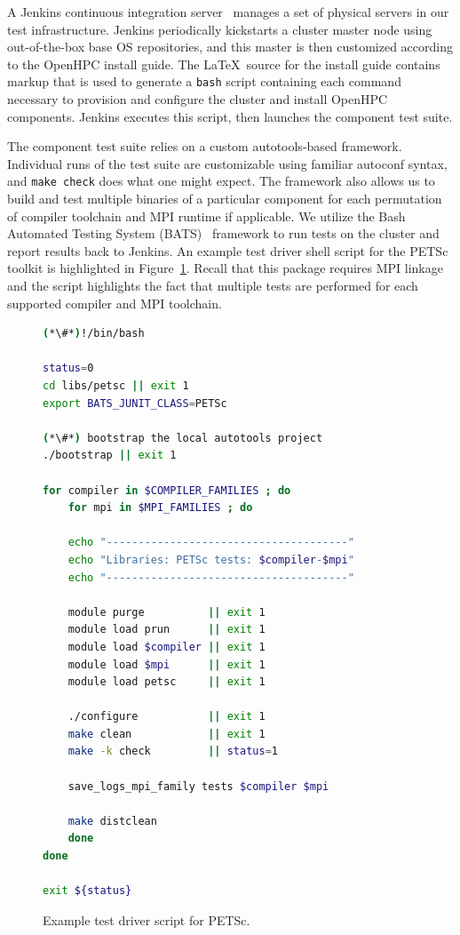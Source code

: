 \documentclass{sig-alternate-05-2015}
\begin{document}
A Jenkins continuous integration server~\cite{jenkins_url} manages a set of 
physical servers in our test infrastructure. Jenkins periodically kickstarts a cluster 
master node using out-of-the-box base OS repositories, and this master is then 
customized according to the OpenHPC install guide. The \LaTeX\ source for the 
install guide contains markup that is used to generate a \texttt{{bash}} script 
containing each command necessary to provision and configure the cluster and install OpenHPC
components. Jenkins executes this script, then launches the component test suite.

The component test suite relies on a custom autotools-based framework.
Individual runs of the test suite are customizable using familiar autoconf
syntax, and \texttt{{make check}} does what one might expect. The framework
also allows us to build and test multiple binaries of a particular component
for each permutation of compiler toolchain and MPI runtime if applicable.  We
utilize the Bash Automated Testing System (BATS)~\cite{bats_url} framework to
run tests on the cluster and report results back to Jenkins. An example test
driver shell script for the PETSc toolkit is highlighted in Figure~\ref{fig:test_loop}. Recall that this package
requires MPI linkage and the script highlights the fact that multiple tests are
performed for each supported compiler and MPI toolchain.

\begin{figure}[t]
\begin{lstlisting}[language=bash,keywords={},keepspaces]
(*\#*)!/bin/bash

status=0
cd libs/petsc || exit 1
export BATS_JUNIT_CLASS=PETSc

(*\#*) bootstrap the local autotools project 
./bootstrap || exit 1

for compiler in $COMPILER_FAMILIES ; do
    for mpi in $MPI_FAMILIES ; do

    echo "--------------------------------------"
    echo "Libraries: PETSc tests: $compiler-$mpi"
    echo "--------------------------------------"

    module purge          || exit 1
    module load prun      || exit 1
    module load $compiler || exit 1
    module load $mpi      || exit 1
    module load petsc     || exit 1

    ./configure           || exit 1
    make clean            || exit 1
    make -k check         || status=1

    save_logs_mpi_family tests $compiler $mpi

    make distclean
    done
done

exit ${status}
\end{lstlisting}
\vspace*{-0.3cm}
\caption{Example test driver script for PETSc.}
\label{fig:test_loop}
\end{figure}
\end{document}
